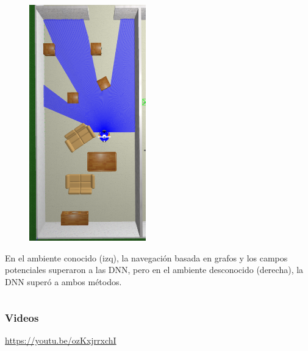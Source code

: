 \begin{frame}
\begin{columns}
\begin{column}{0.35\textwidth}
\begin{figure}
        \includegraphics[width=0.45\textwidth]{Figures/MotionPlanning/Ambiente2.png}
      \end{figure}
      En el ambiente conocido (izq), la navegación basada en grafos y los campos potenciales superaron a las DNN, pero en el ambiente desconocido (derecha), la DNN superó a ambos métodos. 
    \end{column}
  \end{columns}
\end{frame}

\begin{frame}\frametitle{Videos}
  \url{https://youtu.be/ozKxjrrxchI}
\end{frame}
